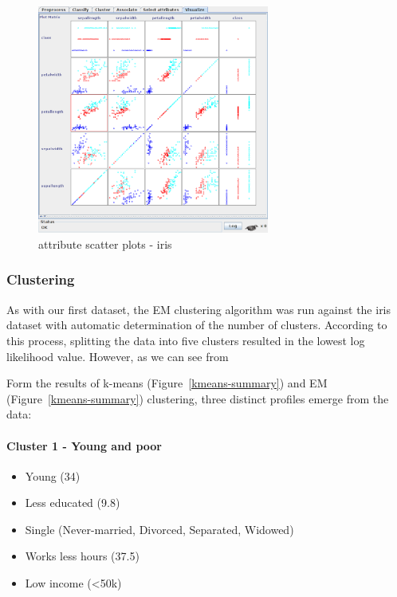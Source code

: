 \documentclass{sig-alternate}
\begin{document}
\begin{figure}[!htbp]
    \centering
    \includegraphics[width=3in]{part2/iris/attribute-scatter.pdf}
    \caption{attribute scatter plots - iris\label{iris-attr-scatter}}
\end{figure} 

\subsubsection{Clustering}


As with our first dataset, the EM clustering algorithm was run against the iris dataset with automatic determination of the number of clusters. According to this process, splitting the data into five clusters resulted in the lowest log likelihood value. However, as we can see from 

Form the results of k-means (Figure~\ref{kmeans-summary}) and EM (Figure~\ref{kmeans-summary}) clustering, three distinct profiles emerge from the data:

\paragraph{Cluster 1 - Young and poor}
\begin{itemize}[itemsep=1pt]
    \item Young (34)
    \item Less educated (9.8)
    \item Single (Never-married, Divorced, Separated, Widowed)
    \item Works less hours (37.5)
    \item Low income (<50k)
\end{itemize}
\end{document}
